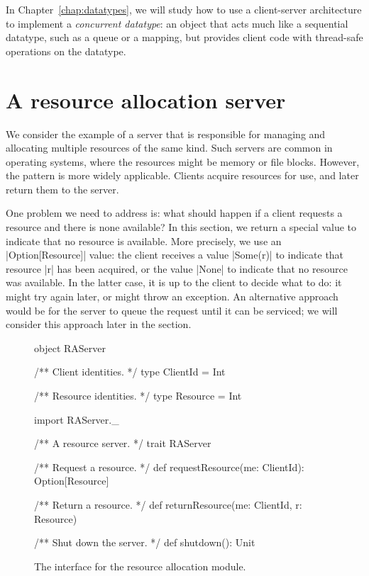 In Chapter~\ref{chap:datatypes}, we will study how to use a client-server
architecture to implement a \emph{concurrent datatype}: an object that acts
much like a sequential datatype, such as a queue or a mapping, but provides
client code with thread-safe operations on the datatype. 


\section{A resource allocation server}

We consider the example of a server that is responsible for managing and
allocating multiple resources of the same kind.  Such servers are common in
operating systems, where the resources might be memory or file blocks.
However, the pattern is more widely applicable.  Clients acquire resources for
use, and later return them to the server.

One problem we need to address is: what should happen if a client requests a
resource and there is none available?  In this section, we return a special
value to indicate that no resource is available.  More precisely, we use an
|Option[Resource]| value: the client receives a value |Some(r)| to indicate
that resource |r| has been acquired, or the value |None| to indicate that no
resource was available.
%
In the latter case, it is up to the client to decide what to do: it might try
again later, or might throw an exception.  
%
An alternative approach would be for the server to queue the request until it
can be serviced; we will consider this approach later in the section.


\begin{figure}
\begin{scala}
object RAServer{
  /** Client identities. */
  type ClientId = Int

  /** Resource identities. */
  type Resource = Int
}

import RAServer._

/** A resource server. */
trait RAServer{
  /** Request a resource. */
  def requestResource(me: ClientId): Option[Resource]

  /** Return a resource. */
  def returnResource(me: ClientId, r: Resource) 

  /** Shut down the server. */
  def shutdown(): Unit
} 
\end{scala}
\caption{The interface for the resource allocation module.}
\label{fig:RAServer}
\end{figure}

